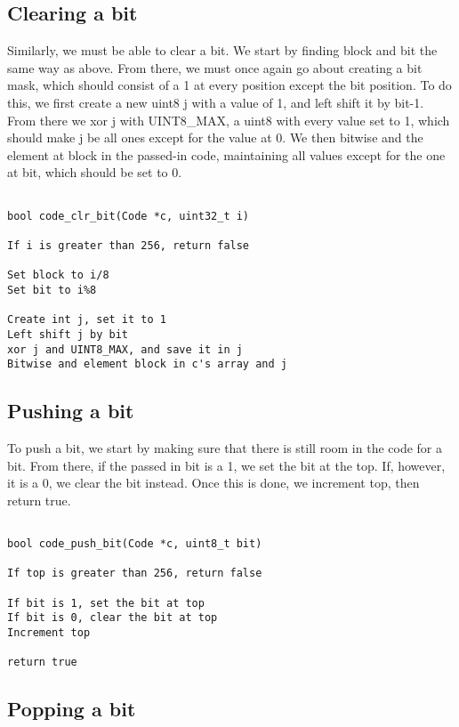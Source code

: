 \documentclass[11pt]{article}
\begin{document}
\subsection{Clearing a bit}

Similarly, we must be able to clear a bit. We start by finding block and bit the same way as above. From there, we must once again go about creating a bit mask, which should consist of a 1 at every position except the bit position. To do this, we first create a new uint8 j with a value of 1, and left shift it by bit-1. From there we xor j with UINT8\_MAX, a uint8 with every value set to 1, which should make j be all ones except for the value at 0. We then bitwise and the element at block in the passed-in code, maintaining all values except for the one at bit, which should be set to 0.

\begin{verbatim}

bool code_clr_bit(Code *c, uint32_t i)

If i is greater than 256, return false

Set block to i/8
Set bit to i%8

Create int j, set it to 1
Left shift j by bit
xor j and UINT8_MAX, and save it in j
Bitwise and element block in c's array and j

\end{verbatim}

\subsection{Pushing a bit}

To push a bit, we start by making sure that there is still room in the code for a bit. From there, if the passed in bit is a 1, we set the bit at the top. If, however, it is a 0, we clear the bit instead. Once this is done, we increment top, then return true.

\begin{verbatim}

bool code_push_bit(Code *c, uint8_t bit)

If top is greater than 256, return false

If bit is 1, set the bit at top
If bit is 0, clear the bit at top
Increment top

return true

\end{verbatim}

\subsection{Popping a bit}
\end{document}

